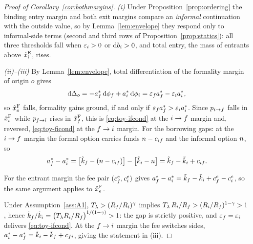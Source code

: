 \documentclass[12pt]{article}
\begin{document}
\begin{proof}[Proof of Corollary~\ref{cor:bothmargins}]
\emph{(i)} Under Proposition~\ref{prop:ordering} the binding entry
margin and both exit margins compare an \emph{informal} continuation
with the outside value, so by Lemma~\ref{lem:envelope} they respond
only to informal-side terms (second and third rows of
Proposition~\ref{prop:statics}): all three thresholds fall when
$\varepsilon_{i}>0$ or $\mathrm{d}b_{i}>0$, and total entry, the mass of entrants above $\hat{x}^{\mathrm{E}}_{i}$, rises.

\emph{(ii)--(iii)} By Lemma~\ref{lem:envelope}, total differentiation
of the formality margin of origin $o$ gives
\begin{equation*}
  \mathrm{d}\Delta_{o}
  =-a^{*}_{f}\,\mathrm{d}\phi_{f}
   +a^{*}_{i}\,\mathrm{d}\phi_{i}
  =\varepsilon_{f}a^{*}_{f}-\varepsilon_{i}a^{*}_{i},
\end{equation*}
so $\hat{x}^{\mathrm{F}}_{o}$ falls, formality gains ground, if and only if
$\varepsilon_{f}a^{*}_{f}>\varepsilon_{i}a^{*}_{i}$.
Since $p_{i\to f}$ falls in $\hat{x}^{\mathrm{F}}_{i}$ while
$p_{f\to i}$ rises in $\hat{x}^{\mathrm{F}}_{f}$, this is
\eqref{eq:toy-ifcond} at the $i\to f$ margin and, reversed,
\eqref{eq:toy-ficond} at the $f\to i$ margin. For the
borrowing gaps: at the $i\to f$ margin the formal option
carries funds $n-c_{if}$ and the informal option
$n$, so
\begin{equation*}
  a^{*}_{f}-a^{*}_{i}
  =\big[\tilde{k}_{f}-(n-c_{if})\big]
   -\big[\tilde{k}_{i}-n\big]
  =\tilde{k}_{f}-\tilde{k}_{i}+c_{if}.
\end{equation*}

For the entrant margin the fee pair $(c^{e}_{f},c^{e}_{i})$ gives
$a^{*}_{f}-a^{*}_{i}
=\tilde{k}_{f}-\tilde{k}_{i}+c^{e}_{f}-c^{e}_{i}$, so the
same argument applies to $\hat{x}^{\mathrm{F}}_{e}$.

Under Assumption~\ref{ass:A1},
$T_{\lambda}>(R_{f}/R_{i})^{\gamma}$ implies
$T_{\lambda}\,R_{i}/R_{f}
>(R_{i}/R_{f})^{1-\gamma}>1$, hence
$\tilde{k}_{f}/\tilde{k}_{i}
=\big(T_{\lambda}R_{i}/R_{f}\big)^{1/(1-\gamma)}>1$:
the gap is strictly positive, and
$\varepsilon_{f}=\varepsilon_{i}$ delivers
\eqref{eq:toy-ifcond}. At the $f\to i$ margin the fee switches
sides, $a^{*}_{i}-a^{*}_{f}
=\tilde{k}_{i}-\tilde{k}_{f}+c_{fi}$, giving the
statement in (iii).
\end{proof}
\end{document}
